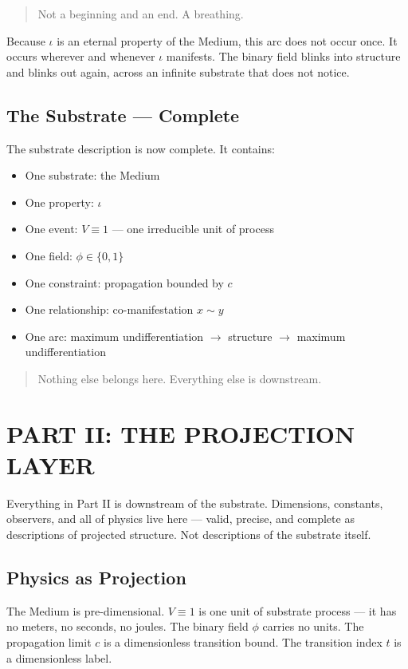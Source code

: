 \documentclass[11pt,letterpaper]{article}
\begin{document}
\begin{quote}
Not a beginning and an end. A breathing.
\end{quote}

Because \(\iota\) is an eternal property of the Medium, this arc does not occur once. It occurs wherever and whenever \(\iota\) manifests. The binary field blinks into structure and blinks out again, across an infinite substrate that does not notice.
\subsection{The Substrate --- Complete}
\label{sec:org3c98ee6}

The substrate description is now complete. It contains:

\begin{itemize}
\item One substrate: the Medium
\item One property: \(\iota\)
\item One event: \(V \equiv 1\) --- one irreducible unit of process
\item One field: \(\phi \in \{0, 1\}\)
\item One constraint: propagation bounded by \(c\)
\item One relationship: co-manifestation \(x \sim y\)
\item One arc: maximum undifferentiation \(\to\) structure \(\to\) maximum undifferentiation
\end{itemize}

\begin{quote}
Nothing else belongs here. Everything else is downstream.
\end{quote}
\section{PART II: THE PROJECTION LAYER}
\label{sec:orgf84ff9e}

Everything in Part II is downstream of the substrate. Dimensions, constants, observers, and all of physics live here --- valid, precise, and complete as descriptions of projected structure. Not descriptions of the substrate itself.
\subsection{Physics as Projection}
\label{sec:org144f3d0}

The Medium is pre-dimensional. \(V \equiv 1\) is one unit of substrate process --- it has no meters, no seconds, no joules. The binary field \(\phi\) carries no units. The propagation limit \(c\) is a dimensionless transition bound. The transition index \(t\) is a dimensionless label.
\end{document}
